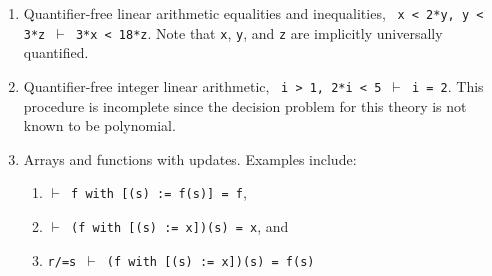 \documentclass[12pt,twoside]{book}
\begin{document}
\begin{description}
\begin{enumerate}
\item Quantifier-free linear arithmetic equalities and inequalities, \eg\
\texttt{x < 2*y, y < 3*z $\vdash$ 3*x < 18*z}.  Note that \texttt{x},
\texttt{y}, and \texttt{z} are implicitly universally quantified.


\item Quantifier-free integer linear arithmetic, \eg\ \texttt{i > 1, 2*i <
5 $\vdash$ i = 2}.  This procedure is incomplete since the decision
problem for this theory is not known to be polynomial.

\item Arrays and functions with updates.  Examples include:
\begin{enumerate}
\item  \texttt{$\vdash$ f with [(s) := f(s)] = f},
\item  \texttt{$\vdash$ (f with [(s) := x])(s) = x}, and
\item  \texttt{r/=s $\vdash$ (f with [(s) := x])(s) = f(s)}
\end{enumerate}
\end{enumerate}


\end{description}
\end{document}
